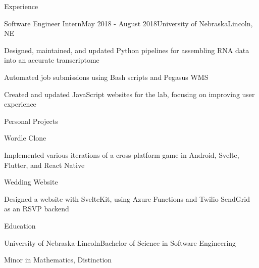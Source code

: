 \documentclass[
	10pt, %
]{article} %
\begin{document}
\begin{rSection}{Experience}
	\begin{rSubsection}{Software Engineer Intern}{May 2018 - August 2018}{University of Nebraska}{Lincoln, NE}
		\item Designed, maintained, and updated Python pipelines for assembling RNA data into an accurate transcriptome
		\item Automated job submissions using Bash scripts and Pegasus WMS
		\item Created and updated JavaScript websites for the lab, focusing on improving user experience
	\end{rSubsection}

\end{rSection}

\begin{rSection}{Personal Projects}

	\begin{rSubsection}{Wordle Clone}{}{}{}
		\item Implemented various iterations of a cross-platform game in Android, Svelte, Flutter, and React Native
	\end{rSubsection}

	\begin{rSubsection}{Wedding Website}{}{}{}
		\item Designed a website with SvelteKit, using Azure Functions and Twilio SendGrid as an RSVP backend
	\end{rSubsection}

\end{rSection}

\begin{rSection}{Education}
	\begin{rSubsection}{University of Nebraska-Lincoln}{}{Bachelor of Science in Software Engineering}{}
		\item[] Minor in Mathematics, Distinction
	\end{rSubsection}
\end{rSection}





\end{document}
